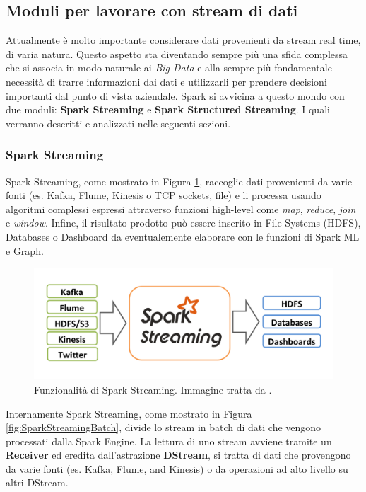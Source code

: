 \documentclass[12pt,italian]{article}
\begin{document}
\subsection{Moduli per lavorare con stream di dati}
Attualmente è molto importante considerare dati provenienti da stream real time, di varia natura. Questo aspetto sta diventando sempre più una sfida complessa che si associa in modo naturale ai \textit{Big Data} e alla sempre più fondamentale necessità di trarre informazioni dai dati e utilizzarli per prendere decisioni importanti dal punto di vista aziendale. \newline
Spark si avvicina a questo mondo con due moduli: \textbf{Spark Streaming} e \textbf{Spark Structured Streaming}. I quali verranno descritti e analizzati nelle seguenti sezioni.
\subsubsection{Spark Streaming}
Spark Streaming, come mostrato in Figura \ref{fig:SparkStreaming}, raccoglie dati provenienti da varie fonti (es. Kafka, Flume, Kinesis o TCP sockets, file) e li processa usando algoritmi complessi espressi attraverso funzioni high-level come \textit{map}, \textit{reduce}, \textit{join} e \textit{window}. Infine, il risultato prodotto può essere inserito in File Systems (HDFS), Databases o Dashboard da eventualemente elaborare con le funzioni di Spark ML e Graph.
\begin{figure}[H]
	\centering 
	\includegraphics[width=1\linewidth]{img/sparkStreaming.png}
	\caption{Funzionalità di Spark Streaming. Immagine tratta da \cite{spark}.}
	\label{fig:SparkStreaming}
\end{figure}
\par Internamente Spark Streaming, come mostrato in  Figura \ref{fig:SparkStreamingBatch}, divide lo stream in batch di dati che vengono processati dalla Spark Engine.
\newline
La lettura di uno stream avviene tramite un \textbf{Receiver} ed eredita dall'astrazione \textbf{DStream}, si tratta di dati che provengono da varie fonti (es. Kafka, Flume, and Kinesis) o da operazioni ad alto livello su altri DStream.
\end{document}
